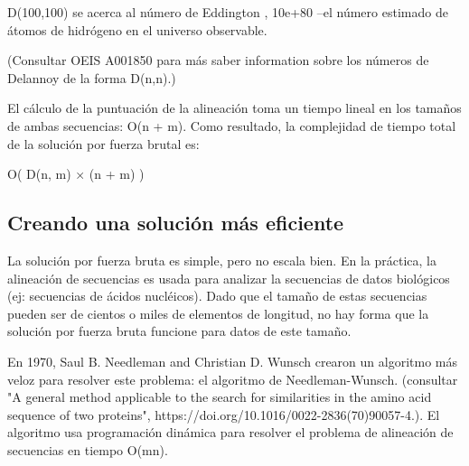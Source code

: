 \documentclass[usenatbib]{tjaa}
\begin{document}
D(100,100) se acerca al número de Eddington , 10e+80 --el número estimado de átomos de hidrógeno en el universo observable.

(Consultar OEIS A001850 para más saber information sobre los números de Delannoy  de la forma D(n,n).)

El cálculo de la puntuación de la alineación toma un tiempo lineal en los tamaños de ambas secuencias: O(n + m).
Como resultado, la complejidad de tiempo total de la solución por fuerza brutal es:

O( D(n, m) × (n + m) )











\subsection{Creando una solución más eficiente}
La solución por fuerza bruta es simple, pero no escala bien. En la práctica, la alineación de secuencias es usada para analizar la secuencias de datos biológicos (ej: secuencias de ácidos nucléicos). Dado que el tamaño de estas secuencias pueden ser de cientos o miles de elementos de longitud, no hay forma que la solución por fuerza bruta funcione para datos de este tamaño.


En 1970, Saul B. Needleman and Christian D. Wunsch crearon un algoritmo más veloz para resolver este problema: el algoritmo de  Needleman-Wunsch. (consultar "A general method applicable to the search for similarities in the amino acid sequence of two proteins", https://doi.org/10.1016/0022-2836(70)90057-4.). El algoritmo usa programación dinámica para resolver el problema de alineación de secuencias en tiempo O(mn).
\end{document}
